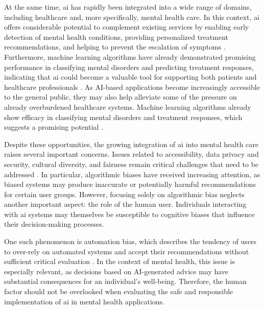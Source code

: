 \documentclass[sigconf,natbib=false]{acmart}
\begin{document}
At the same time, \Gls{ai} has rapidly been integrated into a wide range of domains, including healthcare and, more specifically, mental health care.
In this context, \Gls{ai} offers considerable potential to complement existing services by enabling early detection of mental health conditions, providing personalized treatment recommendations, and helping to prevent the escalation of symptoms \autocite[]{mikaeili_reimagining_2025}.
Furthermore, machine learning algorithms have already demonstrated promising performance in classifying mental disorders and predicting treatment responses, indicating that \Gls{ai} could become a valuable tool for supporting both patients and healthcare professionals \autocite[]{gonzalez_systematic_review}.
As AI-based applications become increasingly accessible to the general public, they may also help alleviate some of the pressure on already overburdened healthcare systems. Machine learning algorithms already show efficacy in classifying mental disorders and treatment responses, which suggests a promising potential \autocite[]{gonzalez_systematic_review}.

Despite these opportunities, the growing integration of \Gls{ai} into mental health care raises several important concerns.
Issues related to accessibility, data privacy and security, cultural diversity, and fairness remain critical challenges that need to be addressed \autocite[]{ali_artificial_2025}.
In particular, algorithmic biases have received increasing attention, as biased systems may produce inaccurate or potentially harmful recommendations for certain user groups.
However, focusing solely on algorithmic bias neglects another important aspect: the role of the human user.
Individuals interacting with \Gls{ai} systems may themselves be susceptible to cognitive biases that influence their decision-making processes.

One such phenomenon is automation bias, which describes the tendency of users to over-rely on automated systems and accept their recommendations without sufficient critical evaluation \autocite[p~391]{parasuraman_complacency_2010}. 
In the context of mental health, this issue is especially relevant, as decisions based on AI-generated advice may have substantial consequences for an individual’s well-being.
Therefore, the human factor should not be overlooked when evaluating the safe and responsible implementation of \Gls{ai} in mental health applications. 
\end{document}

